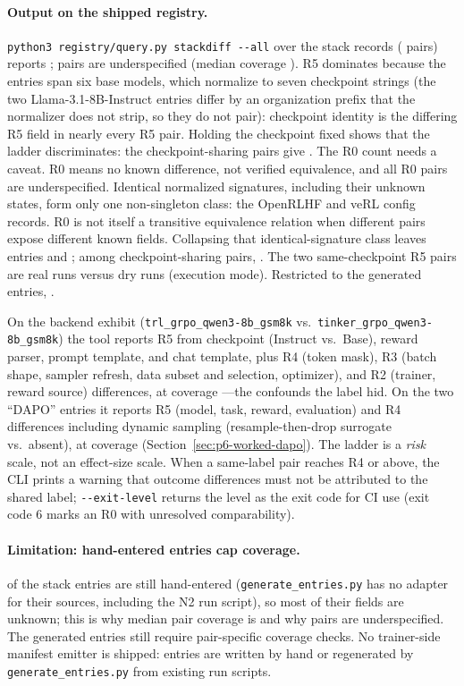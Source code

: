 \paragraph{Output on the shipped registry.}
\texttt{python3 registry/query.py stackdiff -{}-all} over the \NSTACK{} stack
records (\STACKDIFFNPAIRS{} pairs) reports \STACKDIFFDIST{};
\STACKDIFFUNDER{} pairs are underspecified (median coverage \COVMED{}). R5
dominates because the entries span six base models, which normalize to seven
checkpoint strings (the two Llama-3.1-8B-Instruct entries differ by an
organization prefix that the normalizer does not strip, so they do not
pair): checkpoint identity is
the differing R5 field in nearly every R5 pair. Holding the checkpoint fixed
shows that the ladder discriminates: the checkpoint-sharing pairs give \SAMECKPT{}. The R0 count needs
a caveat. R0 means no known difference, not verified equivalence, and all
\NRZERO{} R0 pairs are underspecified. Identical normalized signatures,
including their unknown states, form only one non-singleton class:
the OpenRLHF and veRL config records. R0 is not itself a transitive
equivalence relation when different pairs expose different known fields.
Collapsing that identical-signature class leaves \DEDUPN{}
entries and \DEDUPALL{}; among checkpoint-sharing pairs, \DEDUPSAME{}. The two
same-checkpoint R5 pairs are real runs versus dry runs (execution mode).
Restricted to the \NGEN{} generated entries, \GENPAIRS{}.

On the backend exhibit (\texttt{trl\_grpo\_qwen3-8b\_gsm8k} vs.\
\texttt{tinker\_grpo\_qwen3-8b\_gsm8k}) the tool reports R5 from checkpoint
(Instruct vs.\ Base), reward parser, prompt template, and chat template, plus
R4 (token mask), R3 (batch shape, sampler refresh, data subset and selection,
optimizer), and R2 (trainer, reward source) differences, at coverage
\STACKDIFFCOVA{}---the confounds the label hid. On the two ``DAPO'' entries it
reports R5 (model, task, reward, evaluation) and R4 differences including
dynamic sampling (resample-then-drop surrogate vs.\ absent), at coverage \STACKDIFFCOVB{}
(Section~\ref{sec:p6-worked-dapo}). The ladder is a \emph{risk} scale, not an
effect-size scale. When a same-label pair reaches R4 or above, the CLI prints a
warning that outcome differences must not be attributed to the shared label;
\texttt{-{}-exit-level} returns the level as the exit code for CI use (exit
code 6 marks an R0 with unresolved comparability).

\paragraph{Limitation: hand-entered entries cap coverage.} \NHAND{} of the
\NSTACK{} stack entries are still hand-entered (\texttt{generate\_entries.py}
has no adapter for their sources, including the N2 run script), so most of their fields are unknown; this is why median pair
coverage is \COVMED{} and why \STACKDIFFUNDER{} pairs are underspecified. The \NGEN{}
generated entries still require pair-specific coverage checks. No
trainer-side manifest emitter is shipped: entries are written by hand or
regenerated by \texttt{generate\_entries.py} from existing run scripts.
